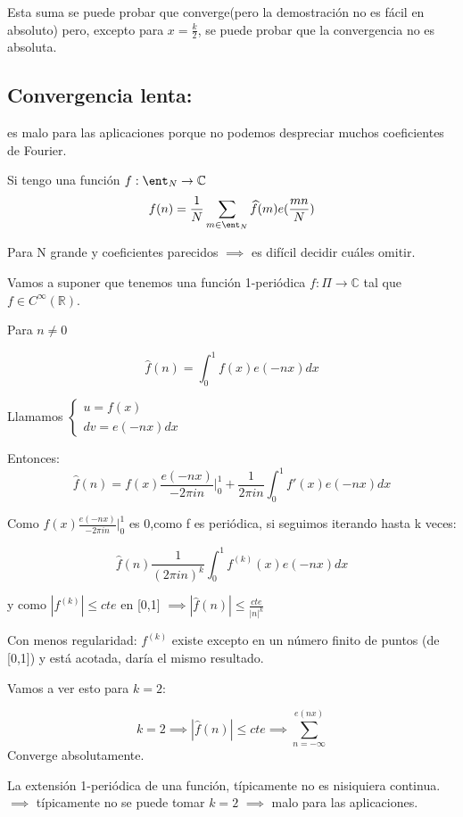 Esta suma se puede probar que converge(pero la demostración no es fácil en absoluto) pero, excepto para $x = \frac{k}{2}$, se puede probar que la convergencia no es absoluta.

\subsection{Convergencia lenta:} es malo para las aplicaciones porque no podemos despreciar muchos coeficientes de Fourier.

	Si tengo una función $f: \ent_N \rightarrow \mathbb{C}$
	$$f(n) = \frac{1}{N}\sum_{m \in \ent_N}\widehat{f}(m)e(\frac{mn}{N})$$

	Para N grande y coeficientes parecidos $\implies$ es difícil decidir cuáles omitir.

	Vamos a suponer que tenemos una función 1-periódica $f : \Pi \rightarrow \mathbb{C}$ tal que $f \in C^{\infty}(\mathbb{R})$.

	Para $n \neq 0$

	$$\widehat{f}(n) = \int_{0}^{1} f(x) e(-nx) dx$$

	Llamamos $\begin{cases}
	u = f(x)\\
	dv = e(-nx) dx
	\end{cases}$

	Entonces:
	$$\widehat{f}(n) = f(x) \frac{e(-nx)}{-2\pi in}|_{0}^1 + \frac{1}{2\pi i n} \int_{0}^1 f'(x) e(-nx) dx$$

	Como $f(x) \frac{e(-nx)}{-2\pi in}|_{0}^1 $ es 0,como f es periódica, si seguimos iterando hasta k veces:

	$$\widehat{f}(n)  \frac{1}{(2\pi i n)^k} \int_{0}^1 f^{(k)}(x) e(-nx) dx$$

	y como $|f^{(k)}| \leq cte$ en [0,1] $\implies |\widehat{f}(n)| \leq \frac{cte}{|n|^k}$

	Con menos regularidad: $f^{(k)}$ existe excepto en un número finito de puntos (de [0,1]) y está acotada, daría el mismo resultado.

	Vamos a ver esto para $k=2$:

	$$k=2 \implies |\widehat{f}(n)| \leq cte \implies \sum_{n= -\infty}^{e(nx)}$$
	Converge absolutamente.


\begin{center}
	\centering
\end{center}

	La extensión 1-periódica de una función, típicamente no es nisiquiera continua. $\implies$ típicamente no se puede tomar $k=2$ $\implies$ malo para las aplicaciones.

